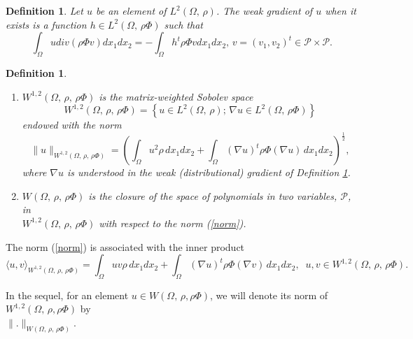 \documentclass[11pt]{article}
\newtheorem{definition}[theorem]{Definition}
\begin{document}
	\begin{definition}\label{dweakd} Let  $u$ be an element of $L^2(\Omega,\, \rho)$. The weak gradient of $u$ when it exists is a function $h\in L^{2}(\Omega,\,\rho\Phi)$ such that 
		\begin{equation}\label{weakd}
\int_{\Omega}u div(\rho\Phi v)dx_1dx_2=-\int_{\Omega}h^t\rho\Phi vdx_1dx_2,\,v=(v_1,v_2)^t\in \mathcal{P}\times\mathcal{P}.
		\end{equation}
	\end{definition}
	
	\begin{definition}\label{WSS}\hspace{1cm}\\
		\begin{enumerate}
			\item $W^{1,2}(\Omega,\,\rho,\,\rho\Phi)$ is the matrix-weighted Sobolev space
			$$W^{1,2}(\Omega,\,\rho,\,\rho\Phi)=\left\{u \in L^2(\Omega,\,  \rho);\,\nabla u \in L^{2}\left(\Omega,\,\rho\Phi\right)\right\}$$
			endowed with the norm \begin{equation}\label{norm} \lVert u \rVert_{W^{1,2}(\Omega,\, \rho,\,\rho\Phi)} =\left( \int_\Omega u^2 \rho \,dx_1dx_2 + \int_\Omega (\nabla u)^t \rho \Phi (\nabla u) \,dx_1dx_2 \right)^{\frac{1}{2}},\end{equation}
			where $\nabla u$ is understood in the weak (distributional) gradient of Definition \ref{dweakd}.
			\item $W(\Omega,\,\rho,\,\rho\Phi)$ is the closure of the space of polynomials in two variables, $\mathcal{P}$, in\\ $W^{1,2}(\Omega,\,\rho,\,\rho\Phi)$ with respect to the norm (\ref{norm}).
		\end{enumerate}
	\end{definition}
	
	The norm (\ref{norm}) is associated with the inner product
	$$\langle u, v \rangle_{W^{1,2}(\Omega,\, \rho,\,\rho\Phi)} = \int_\Omega u v \rho \,dx_1dx_2 + \int_\Omega (\nabla u)^t \rho \Phi (\nabla v) \,dx_1dx_2,\;\; u,v\in W^{1,2}(\Omega,\, \rho,\,\rho\Phi).$$
	
	In the sequel, for an element $u\in W(\Omega,\, \rho,\rho\Phi)$, we will denote its norm of $W^{1,2}(\Omega,\, \rho,\rho\Phi)$ by\\ $\lVert . \rVert_{W(\Omega,\, \rho,\,\rho\Phi)}$.
	
\end{document}
